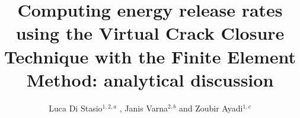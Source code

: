 \documentclass[a4paper]{jpconf}
\begin{document}

\title{Computing energy release rates using the Virtual Crack Closure Technique with the Finite Element Method: analytical discussion}

\author{Luca Di Stasio$^{1,2,a}$ , Janis Varna$^{2,b}$ and Zoubir Ayadi$^{1,c}$ }

\address{$^{1}$SI2M, IJL, EEIGM, Universit\'e de Lorraine, 6 Rue Bastien Lepage, F-54010 Nancy, France\\$^{2}$Division of Polymer Engineering, Lule\aa\ University of Technology, SE-97187 Lule\aa , Sweden }

{\vspace*{5pt}\address{E-mail: $^{a}$luca.di-stasio@univ-lorraine.fr, $^{b}$janis.varna@ltu.se, $^{c}$zoubir.ayadi@univ-lorraine.fr}}

\end{document}

